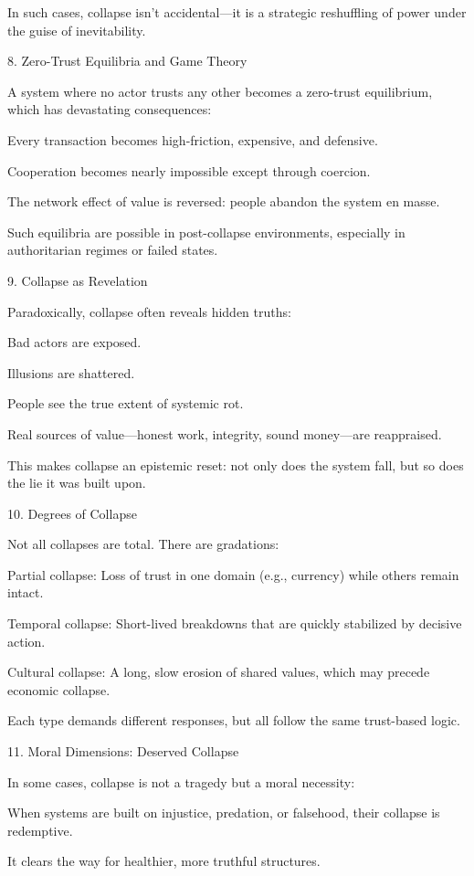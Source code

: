 \documentclass[11pt,oneside]{book}
\begin{document}
In such cases, collapse isn’t accidental—it is a strategic reshuffling of power under the guise of inevitability.

8. Zero-Trust Equilibria and Game Theory


A system where no actor trusts any other becomes a zero-trust equilibrium, which has devastating consequences:

    Every transaction becomes high-friction, expensive, and defensive.

    Cooperation becomes nearly impossible except through coercion.

    The network effect of value is reversed: people abandon the system en masse.

Such equilibria are possible in post-collapse environments, especially in authoritarian regimes or failed states.

9. Collapse as Revelation


Paradoxically, collapse often reveals hidden truths:

    Bad actors are exposed.

    Illusions are shattered.

    People see the true extent of systemic rot.

    Real sources of value—honest work, integrity, sound money—are reappraised.

This makes collapse an epistemic reset: not only does the system fall, but so does the lie it was built upon.

10. Degrees of Collapse


Not all collapses are total. There are gradations:

    Partial collapse: Loss of trust in one domain (e.g., currency) while others remain intact.

    Temporal collapse: Short-lived breakdowns that are quickly stabilized by decisive action.

    Cultural collapse: A long, slow erosion of shared values, which may precede economic collapse.

Each type demands different responses, but all follow the same trust-based logic.

11. Moral Dimensions: Deserved Collapse


In some cases, collapse is not a tragedy but a moral necessity:

    When systems are built on injustice, predation, or falsehood, their collapse is redemptive.

    It clears the way for healthier, more truthful structures.
\end{document}
